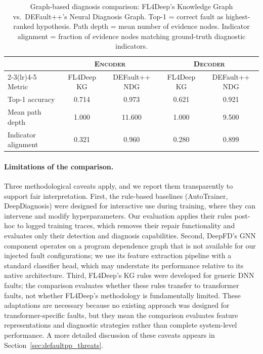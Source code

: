 \begin{table}[!ht]
\centering
\caption{Graph-based diagnosis comparison: FL4Deep's Knowledge Graph vs.\ DEFault++'s Neural Diagnosis Graph. Top-1 = correct fault as highest-ranked hypothesis. Path depth = mean number of evidence nodes. Indicator alignment = fraction of evidence nodes matching ground-truth diagnostic indicators.}
\label{tab:baseline_graph}
\small
\begin{tabular}{l cc cc}
\toprule
& \multicolumn{2}{c}{\textsc{Encoder}} & \multicolumn{2}{c}{\textsc{Decoder}} \\
\cmidrule(lr){2-3}\cmidrule(lr){4-5}
Metric & FL4Deep KG & DEFault++ NDG & FL4Deep KG & DEFault++ NDG \\
\midrule
Top-1 accuracy        & 0.714   & 0.973   & 0.621   & 0.921 \\
Mean path depth       & 1.000   & 11.600   & 1.000   & 9.500 \\
Indicator alignment   & 0.321   & 0.960   & 0.280   & 0.899 \\
\bottomrule
\end{tabular}
\end{table}

\paragraph{Limitations of the comparison.}
Three methodological caveats apply, and we report them transparently to support fair interpretation. First, the rule-based baselines (AutoTrainer, DeepDiagnosis) were designed for interactive use during training, where they can intervene and modify hyperparameters. Our evaluation applies their rules post-hoc to logged training traces, which removes their repair functionality and evaluates only their detection and diagnosis capabilities. Second, DeepFD's GNN component operates on a program dependence graph that is not available for our injected fault configurations; we use its feature extraction pipeline with a standard classifier head, which may understate its performance relative to its native architecture. Third, FL4Deep's KG rules were developed for generic DNN faults; the comparison evaluates whether these rules transfer to transformer faults, not whether FL4Deep's methodology is fundamentally limited. These adaptations are necessary because no existing approach was designed for transformer-specific faults, but they mean the comparison evaluates feature representations and diagnostic strategies rather than complete system-level performance. A more detailed discussion of these caveats appears in Section~\ref{sec:defaultpp_threats}.


